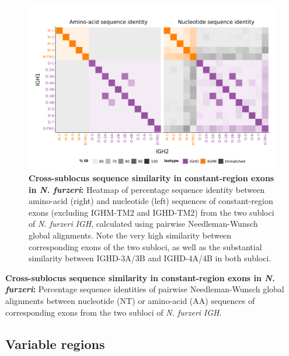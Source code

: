	\begin{figure}
	\centering
	\includegraphics[width = \textwidth]{_Figures/png/nfu-ch-aln}
	\caption[Cross-sublocus sequence similarity in constant-region exons in \textit{N. furzeri} \textit{IGH}]{\textbf{Cross-sublocus sequence similarity in constant-region exons in \textit{N. furzeri}:} Heatmap of percentage sequence identity between amino-acid (right) and nucleotide (left) sequences of constant-region exons (excluding IGHM-TM2 and IGHD-TM2) from the two subloci of \textit{N. furzeri} \textit{IGH}, calculated using pairwise Needleman-Wunsch global alignments. Note the very high similarity between corresponding exons of the two subloci, as well as the substantial similarity between IGHD-3A/3B and IGHD-4A/4B in both subloci.}
	\label{fig:nfu-ch-aln}
	\end{figure}
	
	\begin{table}\centering
		\caption[Cross-sublocus sequence similarity between corresponding constant-region exons in \textit{N. furzeri} \textit{IGH}]{\textbf{Cross-sublocus sequence similarity in constant-region exons in \textit{N. furzeri}:} Percentage sequence identities of pairwise Needleman-Wunsch global alignments between nucleotide (NT) or amino-acid (AA) sequences of corresponding exons from the two subloci of \textit{N. furzeri} \textit{IGH}.}
	
	\label{tab:nfu-ch-aln}
	\end{table}
	




	\subsection{Variable regions}
	\label{sec:nfu-locus-variable}
	
